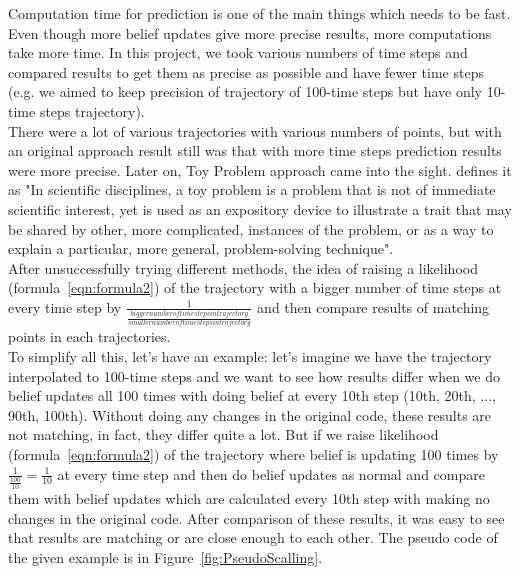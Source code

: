 Computation time for prediction is one of the main things which needs to be fast. Even though more belief updates give more precise results, more computations take more time. In this project, we took various numbers of time steps and compared results to get them as precise as possible and have fewer time steps (e.g. we aimed to keep precision of trajectory of 100-time steps but have only 10-time steps trajectory). \\
There were a lot of various trajectories with various numbers of points, but with an original approach result still was that with more time steps prediction results were more precise. Later on, Toy Problem approach came into the sight. \cite{ToyPr} defines it as "In scientific disciplines, a toy problem is a problem that is not of immediate scientific interest, yet is used as an expository device to illustrate a trait that may be shared by other, more complicated, instances of the problem, or as a way to explain a particular, more general, problem-solving technique". \\
After unsuccessfully trying different methods, the idea of raising a likelihood (formula~\ref{eqn:formula2}) of the trajectory with a bigger number of time steps at every time step by $\frac{1}{\frac{bigger number of time steps in trajectory}{smaller number of time steps in trajectory}}$ and then compare results of matching points in each trajectories. \\
To simplify all this, let's have an example: let's imagine we have the trajectory interpolated to 100-time steps and we want to see how results differ when we do belief updates all 100 times with doing belief at every 10th step (10th, 20th, ..., 90th, 100th). Without doing any changes in the original code, these results are not matching, in fact, they differ quite a lot. But if we raise likelihood (formula~\ref{eqn:formula2}) of the trajectory where belief is updating 100 times by $\frac{1}{\frac{100}{10}} = \frac{1}{10}$ at every time step and then do belief updates as normal and compare them with belief updates which are calculated every 10th step with making no changes in the original code. After comparison of these results, it was easy to see that results are matching or are close enough to each other. The pseudo code of the given example is in Figure~\ref{fig:PseudoScalling}.

